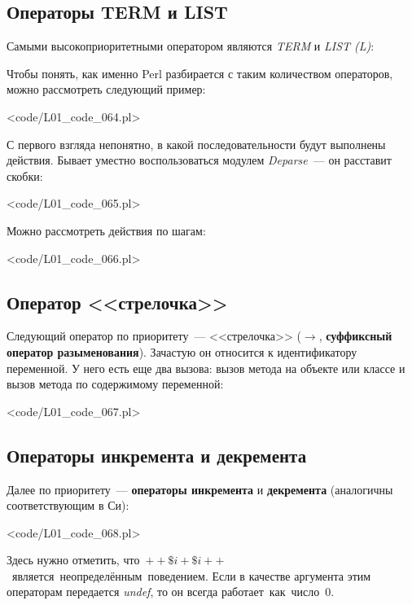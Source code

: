 \subsection{Операторы TERM и LIST}
Самыми высокоприоритетными оператором являются \textit{TERM} и \textit{LIST (L)}:

\begin{comment}
Любая переменная ($variable)
Обращение к хэшу или массиву ($hash{key} или $array[$x])
Любая строка ("string" или 'str'), число (42, -1e42) или quote-
like оператор
Любой вызов функции со скобками func(...)
do{ ... }, eval{ ... }, sub{ ... }
Анонимные конструкторы
{ ... } и [ ... ]
\end{comment}

Чтобы понять, как именно Perl разбирается с таким количеством операторов, можно рассмотреть следующий пример:

\pr<code/L01_code_064.pl>

С первого взгляда непонятно, в какой последовательности будут выполнены действия.
Бывает уместно воспользоваться модулем \textit{Deparse}~--- он расставит скобки:

\pr<code/L01_code_065.pl>

Можно рассмотреть действия по шагам:

\pr<code/L01_code_066.pl>

\subsection{Оператор <<стрелочка>>}
Следующий оператор по приоритету~--- <<стрелочка>> ($\to$, \textbf{суффиксный оператор разыменования}).
Зачастую он относится к идентификатору переменной.
У него есть еще два вызова: вызов метода на объекте или классе и вызов метода по содержимому переменной:

\pr<code/L01_code_067.pl>

\subsection{Операторы инкремента и декремента}
Далее по приоритету~--- \textbf{операторы инкремента} и \textbf{декремента} (аналогичны соответствующим в Си):

\pr<code/L01_code_068.pl>

Здесь нужно отметить, что~$++\$i + \$i++$ является неопределённым поведением.
Если в качестве аргумента этим операторам передается \textit{undef}, то он всегда работает как число 0.

